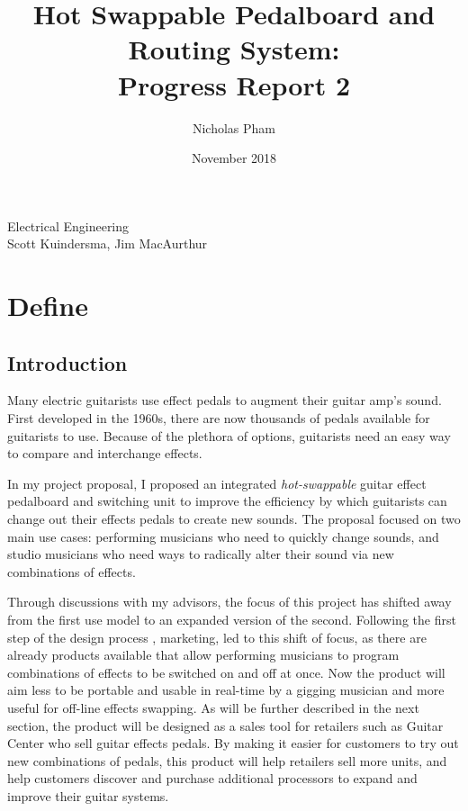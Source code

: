 \documentclass{article}
\title{Hot Swappable Pedalboard and Routing System:\\Progress Report 2}
\author{Nicholas Pham}
\date{November 2018}
\begin{document}
\maketitle
\begin{center}
    Electrical Engineering \\
    Scott Kuindersma, Jim MacAurthur
\end{center}

\newpage
\glsaddall
\printglossaries
\newpage

\section{Define}
	\subsection{Introduction}
	
	Many electric guitarists use effect pedals to augment their guitar amp's sound.  First developed in the 1960s, there are now thousands of pedals available for guitarists to use.  Because of the plethora of options, guitarists need an easy way to compare and interchange effects.

	In my project proposal, I proposed an integrated \emph{hot-swappable} guitar effect pedalboard and switching unit to improve the efficiency by which guitarists can change out their effects pedals to create new sounds.  The proposal focused on two main use cases: performing musicians who need to quickly change sounds, and studio musicians who need ways to radically alter their sound via new combinations of effects.

	Through discussions with my advisors, the focus of this project has shifted away from the first use model to an expanded version of the second.  Following the first step of the design process \cite{ES100Lec3}, marketing, led to this shift of focus, as there are already products available that allow performing musicians to program combinations of effects to be switched on and off at once.  Now the product will aim less to be portable and usable in real-time by a gigging musician and more useful for off-line effects swapping.  As will be further described in the next section, the product will be designed as a sales tool for retailers such as Guitar Center who sell guitar effects pedals.  By making it easier for customers to try out new combinations of pedals, this product will help retailers sell more units, and help customers discover and purchase additional processors to expand and improve their guitar systems.
	
\end{document}
